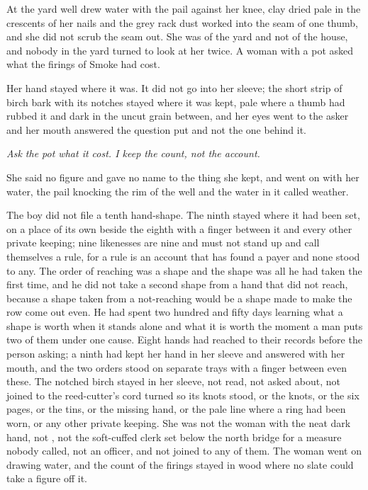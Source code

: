 \scenebreak

At the yard well  drew water with the pail against her knee, clay dried pale in the crescents of her nails and the grey rack dust worked into the seam of one thumb, and she did not scrub the seam out. She was of the yard and not of the house, and nobody in the yard turned to look at her twice. A woman with a pot asked what the firings of Smoke had cost.

Her hand stayed where it was. It did not go into her sleeve; the short strip of birch bark with its notches stayed where it was kept, pale where a thumb had rubbed it and dark in the uncut grain between, and her eyes went to the asker and her mouth answered the question put and not the one behind it.

\emph{Ask the pot what it cost. I keep the count, not the account.}

She said no figure and gave no name to the thing she kept, and went on with her water, the pail knocking the rim of the well and the water in it called weather.

The boy did not file a tenth hand-shape. The ninth stayed where it had been set, on a place of its own beside the eighth with a finger between it and every other private keeping; nine likenesses are nine and must not stand up and call themselves a rule, for a rule is an account that has found a payer and none stood to any. The order of reaching was a shape and the shape was all he had taken the first time, and he did not take a second shape from a hand that did not reach, because a shape taken from a not-reaching would be a shape made to make the row come out even. He had spent two hundred and fifty days learning what a shape is worth when it stands alone and what it is worth the moment a man puts two of them under one cause. Eight hands had reached to their records before the person asking; a ninth had kept her hand in her sleeve and answered with her mouth, and the two orders stood on separate trays with a finger between even these. The notched birch stayed in her sleeve, not read, not asked about, not joined to the reed-cutter's cord turned so its knots stood, or the knots, or the six pages, or the tins, or the missing hand, or the pale line where a ring had been worn, or any other private keeping. She was not the woman with the neat dark hand, not , not the soft-cuffed clerk set below the north bridge for a measure nobody called, not an officer, and not joined to any of them. The woman went on drawing water, and the count of the firings stayed in wood where no slate could take a figure off it.

